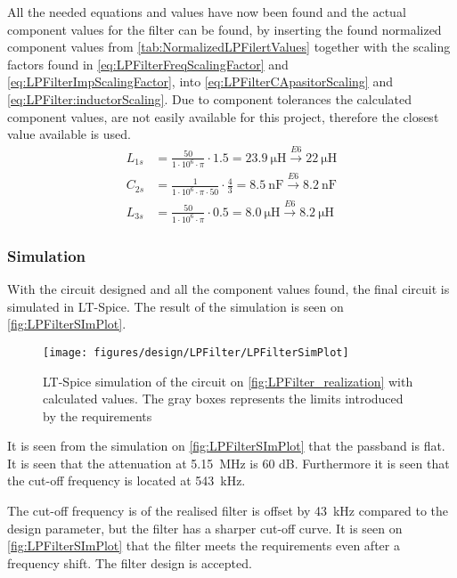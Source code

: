 All the needed equations and values have now been found and the actual component values for the filter can be found, by inserting the found normalized component values from \autoref{tab:NormalizedLPFilertValues} together with the scaling factors found in \autoref{eq:LPFilterFreqScalingFactor} and \autoref{eq:LPFilterImpScalingFactor}, into \autoref{eq:LPFilterCApasitorScaling} and \autoref{eq:LPFilter:inductorScaling}. Due to component tolerances the calculated component values, are not easily available for this project, therefore the closest value available is used. 
\begin{subequations}
\begin{align} 
L_{1s} &= \frac{50}{1 \cdot 10^{6} \cdot \pi} \cdot 1.5  = \SI{23.9}{\micro\henry} \xrightarrow{E6} \SI{22}{\micro\henry} \label{eq:LPFilter:inductorScalingDone2} \\
C_{2s} &= \frac{1}{1 \cdot 10^{6} \cdot \pi \cdot 50} \cdot \frac{4}{3} = \SI{8.5}{\nano\farad} \xrightarrow{E6} \SI{8.2}{\nano\farad}  \label{eq:LPFilter:inductorScalingDone1} \\
L_{3s} &= \frac{50}{1 \cdot 10^{6} \cdot \pi} \cdot 0.5  = \SI{8.0}{\micro\henry} \xrightarrow{E6} \SI{8.2}{\micro\henry} \label{eq:LPFilter:inductorScalingDone3} 
\end{align}
\end{subequations} 

\subsubsection{Simulation}
With the circuit designed and all the component values found, the final circuit is simulated in LT-Spice. The result of the simulation is seen on \autoref{fig:LPFilterSImPlot}. 
\begin{figure}[h!]
    \centering
        \texttt{[image: figures/design/LPFilter/LPFilterSimPlot]}
        \caption{LT-Spice simulation of the circuit on \autoref{fig:LPFilter_realization} with calculated values. The gray boxes represents the limits introduced by the requirements}
        \label{fig:LPFilterSImPlot}
\end{figure}

It is seen from the simulation on \autoref{fig:LPFilterSImPlot} that the passband is flat. It is seen that the attenuation at \SI{5.15}{\mega\hertz} is 60 dB. Furthermore it is seen that the cut-off frequency is located at \SI{543}{\kilo\hertz}. 

The cut-off frequency is of the realised filter is offset by \SI{43}{\kilo\hertz} compared to the design parameter, but the filter has a sharper cut-off curve. It is seen on \autoref{fig:LPFilterSImPlot} that the filter meets the requirements even after a frequency shift. The filter design is accepted. 